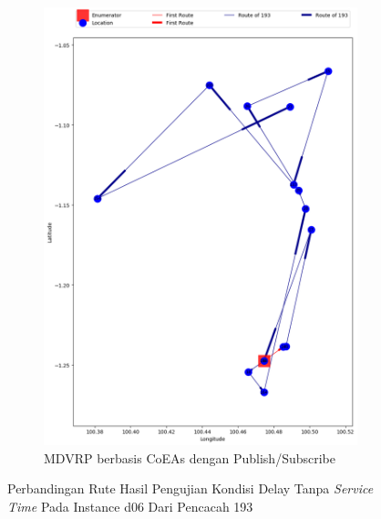 \begin{figure}[H]\ContinuedFloat
	\centering
	\begin{subfigure}[t]{\textwidth}
		\centering
		\includegraphics[width=\textwidth]{Resources/Images/delayed_6/real_m15_n100_delayed_6_193_pubsub_coes}
		\caption{MDVRP berbasis CoEAs dengan Publish/Subscribe}
		\label{fig:real_m15_n100_delayed_6_193_pubsub_coes}
	\end{subfigure}
	\caption{Perbandingan Rute Hasil Pengujian Kondisi Delay Tanpa \textit{Service Time} Pada Instance d06 Dari Pencacah 193}
	\label{fig:real_m15_n100_delayed_6_193_contd}
\end{figure}


